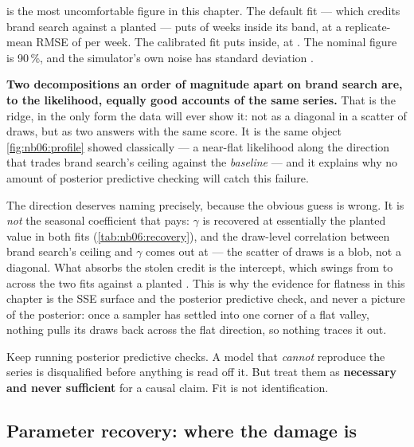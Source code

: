 

 is the most uncomfortable figure in this chapter. The default fit --- which
credits brand search \eur{\nbSixDefBs} against a planted \eur{\nbSixTrueBs} --- puts
\pc{\nbSixPpcCovDef} of weeks inside its band, at a replicate-mean RMSE of \eur{\nbSixPpcRmseDef}
per week. The calibrated fit puts \pc{\nbSixPpcCovCal} inside, at \eur{\nbSixPpcRmseCal}. The
nominal figure is 90\,\%, and the simulator's own noise has standard deviation
\eur{\nbSixDgpSigma}.

\textbf{Two decompositions an order of magnitude apart on brand search are, to the likelihood,
equally good accounts of the same series.} That is the ridge, in the only form the data will ever
show it: not as a diagonal in a scatter of draws, but as two answers with the same score. It is the
same object \cref{fig:nb06:profile} showed classically --- a near-flat likelihood along the
direction that trades brand search's ceiling against the \emph{baseline} --- and it explains why no
amount of posterior predictive checking will catch this failure.

The direction deserves naming precisely, because the obvious guess is wrong. It is \emph{not} the
seasonal coefficient that pays: $\gamma$ is recovered at essentially the planted value in both fits
(\cref{tab:nb06:recovery}), and the draw-level correlation between brand search's ceiling and
$\gamma$ comes out at \nbSixRidgeCorr{} --- the scatter of draws is a blob, not a diagonal. What
absorbs the stolen credit is the intercept, which swings from \eur{\nbSixDefBaseline} to
\eur{\nbSixCalBaseline} across the two fits against a planted \eur{\nbSixTrueBaseline}. This is why
the evidence for flatness in this chapter is the SSE surface and the posterior predictive check, and
never a picture of the posterior: once a sampler has settled into one corner of a flat valley,
nothing pulls its draws back across the flat direction, so nothing traces it out.

Keep running posterior predictive checks. A model that \emph{cannot} reproduce the series is
disqualified before anything is read off it. But treat them as \textbf{necessary and never
sufficient} for a causal claim. Fit is not identification.

\subsection*{Parameter recovery: where the damage is}

